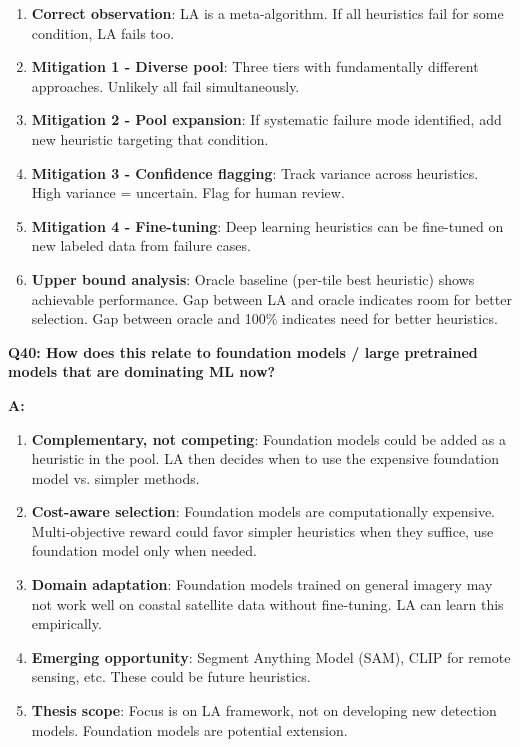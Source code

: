 \documentclass[11pt]{article}
\begin{document}
\begin{enumerate}
    \item \textbf{Correct observation}: LA is a meta-algorithm. If all heuristics fail for some condition, LA fails too.

    \item \textbf{Mitigation 1 - Diverse pool}: Three tiers with fundamentally different approaches. Unlikely all fail simultaneously.

    \item \textbf{Mitigation 2 - Pool expansion}: If systematic failure mode identified, add new heuristic targeting that condition.

    \item \textbf{Mitigation 3 - Confidence flagging}: Track variance across heuristics. High variance = uncertain. Flag for human review.

    \item \textbf{Mitigation 4 - Fine-tuning}: Deep learning heuristics can be fine-tuned on new labeled data from failure cases.

    \item \textbf{Upper bound analysis}: Oracle baseline (per-tile best heuristic) shows achievable performance. Gap between LA and oracle indicates room for better selection. Gap between oracle and 100\% indicates need for better heuristics.
\end{enumerate}

\textbf{Q40: How does this relate to foundation models / large pretrained models that are dominating ML now?}

\textbf{A:}

\begin{enumerate}
    \item \textbf{Complementary, not competing}: Foundation models could be added as a heuristic in the pool. LA then decides when to use the expensive foundation model vs. simpler methods.

    \item \textbf{Cost-aware selection}: Foundation models are computationally expensive. Multi-objective reward could favor simpler heuristics when they suffice, use foundation model only when needed.

    \item \textbf{Domain adaptation}: Foundation models trained on general imagery may not work well on coastal satellite data without fine-tuning. LA can learn this empirically.

    \item \textbf{Emerging opportunity}: Segment Anything Model (SAM), CLIP for remote sensing, etc. These could be future heuristics.

    \item \textbf{Thesis scope}: Focus is on LA framework, not on developing new detection models. Foundation models are potential extension.
\end{enumerate}
\end{document}
